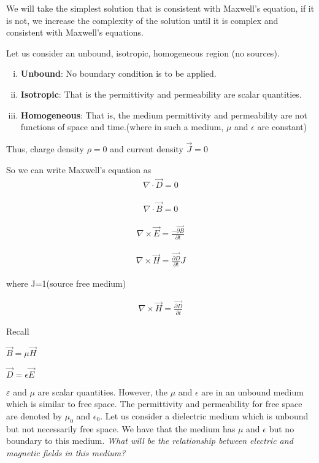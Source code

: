 We will take the simplest solution that is consistent with Maxwell's equation, if it is not, we increase the complexity of the solution until it is complex and consistent with Maxwell's equations.

Let us consider an unbound, isotropic, homogeneous region (no sources).
\begin{enumerate}[(i)]
\item \textbf{Unbound}: No boundary condition is to be applied.
\item \textbf{Isotropic}: That is the permittivity and permeability are scalar quantities.
\item \textbf{Homogeneous}: That is, the medium permittivity and permeability are not functions of space and time.(where  in such a  medium,  $\mu $ and    $\epsilon  $  are    constant) 
\end{enumerate}
Thus, charge density $\rho=0$ and current density $\vec{J}=0$

So we can write Maxwell's equation as
\begin{align}
\nabla\cdot\vec{D}=0
\end{align}

\begin{align}
\nabla\cdot\vec{B}=0
\end{align}

\begin{align}
\nabla\times\vec{E}=\frac{-\vec{\partial B}}{\partial t}
\end{align}

\begin{align}
	\nabla\times\vec{H}=\frac{\vec{\partial D}}{\partial t}J
\end{align}

where J=1(source free medium)

\begin{align}
\nabla\times\vec{H}=\frac{\vec{\partial D}}{\partial t}
\end{align}

Recall 

$\vec{B}=\mu\vec{H}$

$\vec{D}=\epsilon\vec{E}$

$\varepsilon$ and $\mu$ are scalar quantities. However, the $\mu$ and $\epsilon$ are in an unbound medium which is similar to free space. The permittivity and permeability for free space are denoted by $\mu_{0}$ and $\epsilon_{0}$. Let us consider a dielectric medium which is unbound but not necessarily free space. We have that the medium has $\mu$ and $\epsilon$ but no boundary to this medium. \emph{What will be the relationship between electric and magnetic fields in this medium?} 


